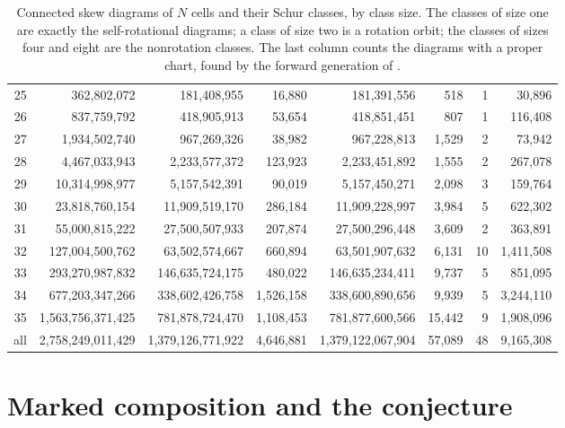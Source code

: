 \documentclass[11pt,a4paper]{amsart}
\numberwithin{equation}{section}
\theoremstyle{plain}
\theoremstyle{definition}
\begin{document}
\begin{table}[ht]
\begin{tabular}{rrrrrrrr}
25 & 362{,}802{,}072 & 181{,}408{,}955 & 16{,}880 & 181{,}391{,}556 & 518 & 1 & 30{,}896 \\
26 & 837{,}759{,}792 & 418{,}905{,}913 & 53{,}654 & 418{,}851{,}451 & 807 & 1 & 116{,}408 \\
27 & 1{,}934{,}502{,}740 & 967{,}269{,}326 & 38{,}982 & 967{,}228{,}813 & 1{,}529 & 2 & 73{,}942 \\
28 & 4{,}467{,}033{,}943 & 2{,}233{,}577{,}372 & 123{,}923 & 2{,}233{,}451{,}892 & 1{,}555 & 2 & 267{,}078 \\
29 & 10{,}314{,}998{,}977 & 5{,}157{,}542{,}391 & 90{,}019 & 5{,}157{,}450{,}271 & 2{,}098 & 3 & 159{,}764 \\
30 & 23{,}818{,}760{,}154 & 11{,}909{,}519{,}170 & 286{,}184 & 11{,}909{,}228{,}997 & 3{,}984 & 5 & 622{,}302 \\
31 & 55{,}000{,}815{,}222 & 27{,}500{,}507{,}933 & 207{,}874 & 27{,}500{,}296{,}448 & 3{,}609 & 2 & 363{,}891 \\
32 & 127{,}004{,}500{,}762 & 63{,}502{,}574{,}667 & 660{,}894 & 63{,}501{,}907{,}632 & 6{,}131 & 10 & 1{,}411{,}508 \\
33 & 293{,}270{,}987{,}832 & 146{,}635{,}724{,}175 & 480{,}022 & 146{,}635{,}234{,}411 & 9{,}737 & 5 & 851{,}095 \\
34 & 677{,}203{,}347{,}266 & 338{,}602{,}426{,}758 & 1{,}526{,}158 & 338{,}600{,}890{,}656 & 9{,}939 & 5 & 3{,}244{,}110 \\
35 & 1{,}563{,}756{,}371{,}425 & 781{,}878{,}724{,}470 & 1{,}108{,}453 & 781{,}877{,}600{,}566 & 15{,}442 & 9 & 1{,}908{,}096 \\
\midrule
all & 2{,}758{,}249{,}011{,}429 & 1{,}379{,}126{,}771{,}922 & 4{,}646{,}881 & 1{,}379{,}122{,}067{,}904 & 57{,}089 & 48 & 9{,}165{,}308 \\
\bottomrule
\end{tabular}
\par\bigskip
\caption{Connected skew diagrams of \(N\) cells and their Schur classes, by class size.  The classes of size one are exactly the self-rotational diagrams; a class of size two is a rotation orbit; the classes of sizes four and eight are the nonrotation classes.  The last column counts the diagrams with a proper chart, found by the forward generation of .}
\label{tab:census}
\end{table}

\section{Marked composition and the conjecture}\label{sec:composition}
\end{document}
